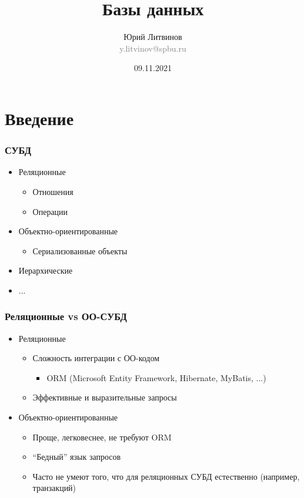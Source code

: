 \documentclass[xetex,mathserif,serif]{beamer}
\title{Базы данных}
\author[Юрий Литвинов]{Юрий Литвинов\\\small{\textcolor{gray}{y.litvinov@spbu.ru}}}
\date{09.11.2021}
\begin{document}
    \frame{\titlepage}

    \section{Введение}

    \begin{frame}
        \frametitle{СУБД}
        \begin{itemize}
            \item Реляционные
            \begin{itemize}
                \item Отношения
                \item Операции
            \end{itemize}
            \item Объектно-ориентированные
            \begin{itemize}
                \item Сериализованные объекты
            \end{itemize}
            \item Иерархические
            \item ...
        \end{itemize}
    \end{frame}

    \begin{frame}
        \frametitle{Реляционные vs ОО-СУБД}
        \begin{itemize}
            \item Реляционные
            \begin{itemize}
                \item Сложность интеграции с ОО-кодом
                \begin{itemize}
                    \item ORM (Microsoft Entity Framework, Hibernate, MyBatis, ...)
                \end{itemize}
                \item Эффективные и выразительные запросы
            \end{itemize}
            \item Объектно-ориентированные
            \begin{itemize}
                \item Проще, легковеснее, не требуют ORM
                \item ``Бедный'' язык запросов
                \item Часто не умеют того, что для реляционных СУБД естественно (например, транзакций)
            \end{itemize}
        \end{itemize}
    \end{frame}
\end{document}
